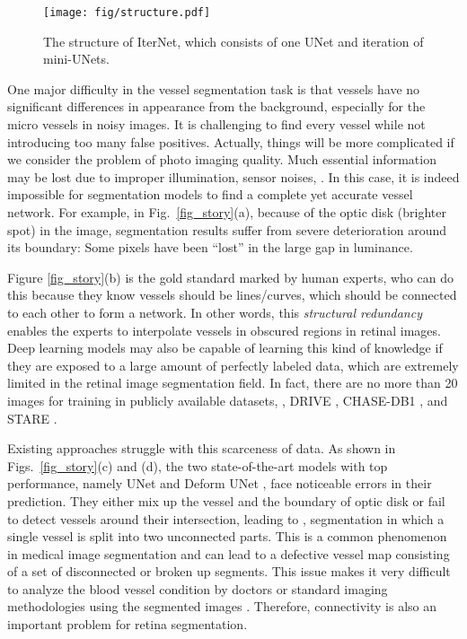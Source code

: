 \documentclass[10pt,twocolumn,letterpaper]{article}
\begin{document}
\begin{figure*}
	\centering
	\texttt{[image: fig/structure.pdf]}
	\caption{The structure of IterNet, which consists of one UNet and iteration of  mini-UNets.}
	\label{fig_structure}
\end{figure*}

One major difficulty in the vessel segmentation task is that vessels have no significant differences in appearance from the background, especially for the micro vessels in noisy images. It is challenging to find every vessel while not introducing too many false positives. Actually, things will be more complicated if we consider the problem of photo imaging quality. Much essential information may be lost due to improper illumination, sensor noises, \etc. In this case, it is indeed impossible for segmentation models to find a complete yet accurate vessel network. For example, in Fig.~\ref{fig_story}(a), because of the optic disk (brighter spot) in the image, segmentation results suffer from severe deterioration around its boundary: Some pixels have been ``lost'' in the large gap in luminance. 

Figure \ref{fig_story}(b) is the gold standard marked by human experts, who can do this because they know vessels should be lines/curves, which should be connected to each other to form a network. In other words, this \emph{structural redundancy} enables the experts to interpolate vessels in obscured regions in retinal images. Deep learning models may also be capable of learning this kind of knowledge if they are exposed to a large amount of perfectly labeled data, which are extremely limited in the retinal image segmentation field. In fact, there are no more than 20 images for training in publicly available datasets, \ie, DRIVE \cite{staal:2004-855}, CHASE-DB1 \cite{owen2009measuring}, and STARE \cite{845178}. 

Existing approaches struggle with this scarceness of data. As shown in Figs.~\ref{fig_story}(c) and (d), the two state-of-the-art models with top performance, namely UNet \cite{UNet} and Deform UNet \cite{JIN2019}, face noticeable errors in their prediction. They either mix up the vessel and the boundary of optic disk or fail to detect vessels around their intersection, leading to \eg, segmentation in which a single vessel is split into two unconnected parts. This is a common phenomenon in medical image segmentation and can lead to a defective vessel map consisting of a set of disconnected or broken up segments. This issue makes it very difficult to analyze the blood vessel condition by doctors or standard imaging methodologies using the segmented images \cite{7319356}. Therefore, connectivity is also an important problem for retina segmentation.
\end{document}
